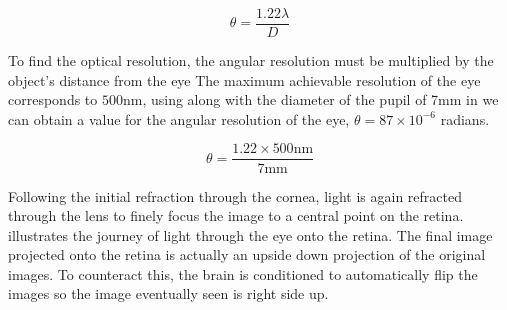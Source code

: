 \begin{equation}
\theta=\frac{1.22\lambda}{D}
\label{eq:res_limit}
\end{equation}

To find the optical resolution, the angular resolution must be multiplied by the
object's distance from the eye The maximum achievable resolution of the eye
corresponds  to $500\textrm{nm}$, using  along with the diameter of
the pupil of 7mm in  we can obtain a value for the angular
resolution of the eye, $\theta=87\times 10^{-6}$ radians.

\begin{equation}
\theta=\frac{1.22\times 500\textrm{nm}}{7\textrm{mm}}
\label{eq:eye_res}
\end{equation}

Following the initial refraction through the cornea, light is again refracted
through the lens to finely focus the image to a central point on the retina.
 illustrates the journey of light through the eye
onto the retina. The final image projected onto the retina is actually an
upside down projection of the original images. To counteract this, the
brain is conditioned to automatically flip the images so the image eventually
seen is right side up.

